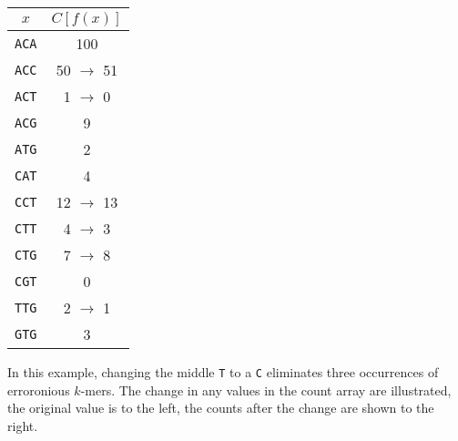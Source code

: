\documentclass[11pt, oneside]{article}   	%
\begin{document}
\begin{enumerate}
\begin{center}
\begin{tabular}{|c|c|}
\hline
$x$ & $C[f(x)]$\\
\hline
\texttt{ACA} & 100\\
\texttt{ACC} & 50 $\rightarrow$ 51\\
\texttt{ACT} & 1 $\rightarrow$ 0 \\
\texttt{ACG} & 9\\
\texttt{ATG} & 2\\
\texttt{CAT} & 4\\
\texttt{CCT} & 12 $\rightarrow$ 13\\
\texttt{CTT} & 4 $\rightarrow$ 3\\
\texttt{CTG} & 7 $\rightarrow$ 8\\
\texttt{CGT} & 0\\
\texttt{TTG} & 2 $\rightarrow$ 1\\
\texttt{GTG} & 3\\
\hline
\end{tabular}
\end{center}

In this example, changing the middle \texttt{T} to a \texttt{C} eliminates three occurrences of erroronious  $k$-mers. 
The change in any values in the count array are illustrated, the original value is to the left, the counts after the change are shown to the right. 

\end{enumerate}
\end{document}
